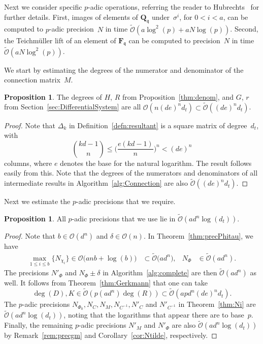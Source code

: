 \documentclass[a4paper,11pt]{article}
\numberwithin{equation}{section}
\newcommand{\QQ}{\mathbf{Q}} %
\newcommand{\FF}{\mathbf{F}} %
\providecommand{\BigOh}{\mathcal{O}}          %
\providecommand{\SoftOh}{\tilde{\mathcal{O}}} %
\theoremstyle{definition}
\newtheorem{prop}[thm]{Proposition}
\begin{document}
Next we consider specific $p$-adic operations, referring the reader to 
Hubrechts~\citep{Hubrechts2010} for further details.  First, images of elements 
of $\QQ_{\mathfrak{q}}$ under~$\sigma^i$, for $0 < i < a$, can be computed to 
$p$-adic precision~$N$ in time $\SoftOh(a \log^2(p) + a N \log(p))$.  Second, 
the Teichm\"uller lift of an element of $\FF_{\mathfrak{q}}$ can be computed 
to precision~$N$ in time $\SoftOh(a N \log^2(p))$.

We start by estimating the degrees of the numerator and denominator of the
connection matrix~$M$.

\begin{prop}
The degrees of $H$, $R$ from Proposition~\ref{thm:denom}, and
$G$, $r$ from Section~\ref{sec:DifferentialSystem} are all
$\BigOh(n(de)^n d_t) \subset \SoftOh((de)^n d_t)$.
\end{prop}

\begin{proof}
Note that $\Delta_k$ in Definition~\ref{defn:resultant} is a square matrix 
of degree~$d_t$, with
\[
{kd-1 \choose n} \leq \biggl( \frac{e(kd-1)}{n} \biggr)^n < (de)^n
\]
columns, where $e$ denotes the base for the natural logarithm. The result 
follows easily from this. Note that the degrees of the numerators and 
denominators of all intermediate results in Algorithm~\ref{alg:Connection} 
are also $\SoftOh((de)^n d_t)$.
\end{proof}

Next we estimate the $p$-adic precisions that we require.

\begin{prop}
All $p$-adic precisions that we use lie in $\SoftOh(a d^n \log(d_t))$.
\end{prop}

\begin{proof}
Note that $b \in \BigOh(d^n)$ and $\delta \in \BigOh(n)$.  
In Theorem~\ref{thm:precPhitau}, we have
\begin{align*}
\max_{1 \leq i \leq b} \{N_{\chi_i}\} \in \BigOh\bigl(a n b + \log(b) \bigr) 
            &\subset \SoftOh\bigl(a d^n \bigr),
&N_{\Phi}   &\in \SoftOh(a d^n).
\end{align*}
The precisions $N'_{\Phi}$ and $N_{\Phi} \pm \delta$ in 
Algorithm~\ref{alg:complete} are then $\SoftOh(ad^n)$ as well.
It follows from Theorem~\ref{thm:Gerkmann} that one can take 
\[
\deg(D), K \in \SoftOh(p (ad^n) \deg(R)) \subset  \SoftOh(apd^n (de)^n d_t).
\] 
The $p$-adic precisions $N_{\Phi_0},N_C,N_M,N_{C^{-1}},N'_{C}$ and $N'_{C^{-1}}$ in
Theorem~\ref{thm:Ni} are $\SoftOh(ad^n \log(d_t))$, noting that the logarithms 
that appear there are to base~$p$. Finally, the remaining $p$-adic precisions 
$N'_M$ and $N'_{\Phi}$ are also $\SoftOh(a d^n \log(d_t))$ by Remark~\ref{rem:precgm} 
and Corollary~\ref{cor:Ntilde}, respectively.
\end{proof}
\end{document}
